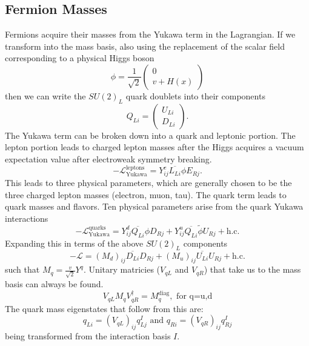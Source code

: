 \subsection{Fermion Masses}
Fermions acquire their masses from the Yukawa term in the Lagrangian.  If we transform into the mass basis, also using the replacement of the scalar field corresponding to a physical Higgs boson
\[ \phi=\frac{1}{\sqrt{2}}\begin{pmatrix}0\\v+H(x)\end{pmatrix} \]
then we can write the $SU(2)_L$ quark doublets into their components \[Q_{Li}=\begin{pmatrix}U_{Li}\\D_{Li}\end{pmatrix}.\]
The Yukawa term can be broken down into a quark and leptonic portion.  The lepton portion leads to charged lepton masses after the Higgs acquires a vacuum expectation value after electroweak symmetry breaking.
\[ -\mathcal{L}^\text{leptons}_\text{Yukawa} = Y_{ij}^e \overline{L_{Li}}\phi E_{Rj}.\]
This leads to three physical parameters, which are generally chosen to be the three charged lepton masses (electron, muon, tau).  The quark term leads to quark masses and flavors. Ten physical parameters arise from the quark Yukawa interactions  
\[ -\mathcal{L}^{\text{quarks}}_\text{Yukawa} = Y_{ij}^d \overline{Q_{Li}} \phi D_{Rj} + Y_{ij}^u \overline{Q_{Li}} \tilde{\phi}U_{Rj} + \text{h.c.}\]
Expanding this in terms of the above $SU(2)_L$ components
\[-\mathcal{L}=(M_d)_{ij}\overline{D_{Li}} D_{Rj} +(M_u)_{ij}\overline{U_{Li}}U_{Rj} +\text{h.c.} \]
such that $M_q = \frac{v}{\sqrt{2}}Y^q$.  Unitary matricies ($V_{qL}$ and $V_{qR}$) that take us to the mass basis can always be found. 
\[V_{qL} M_q V_{qR}^{\dagger} =M_q^\text{diag}, \text{  for q=u,d} \]
The quark mass eigenstates that follow from this are: \[q_{Li}=(V_{qL})_{ij}q_{Lj}^I \text{  and  } q_{Ri} = (V_{qR})_{ij}q_{Rj}^I \] being transformed from the interaction basis $I$.

